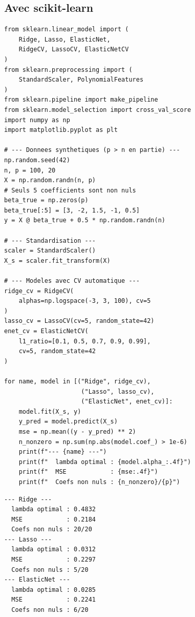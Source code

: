 \subsection{Avec scikit-learn}

\begin{codeblock}[title=\textbf{Ridge, Lasso, Elastic Net -- scikit-learn}]
\begin{verbatim}
from sklearn.linear_model import (
    Ridge, Lasso, ElasticNet,
    RidgeCV, LassoCV, ElasticNetCV
)
from sklearn.preprocessing import (
    StandardScaler, PolynomialFeatures
)
from sklearn.pipeline import make_pipeline
from sklearn.model_selection import cross_val_score
import numpy as np
import matplotlib.pyplot as plt

# --- Donnees synthetiques (p > n en partie) ---
np.random.seed(42)
n, p = 100, 20
X = np.random.randn(n, p)
# Seuls 5 coefficients sont non nuls
beta_true = np.zeros(p)
beta_true[:5] = [3, -2, 1.5, -1, 0.5]
y = X @ beta_true + 0.5 * np.random.randn(n)

# --- Standardisation ---
scaler = StandardScaler()
X_s = scaler.fit_transform(X)

# --- Modeles avec CV automatique ---
ridge_cv = RidgeCV(
    alphas=np.logspace(-3, 3, 100), cv=5
)
lasso_cv = LassoCV(cv=5, random_state=42)
enet_cv = ElasticNetCV(
    l1_ratio=[0.1, 0.5, 0.7, 0.9, 0.99],
    cv=5, random_state=42
)

for name, model in [("Ridge", ridge_cv),
                     ("Lasso", lasso_cv),
                     ("ElasticNet", enet_cv)]:
    model.fit(X_s, y)
    y_pred = model.predict(X_s)
    mse = np.mean((y - y_pred) ** 2)
    n_nonzero = np.sum(np.abs(model.coef_) > 1e-6)
    print(f"--- {name} ---")
    print(f"  lambda optimal : {model.alpha_:.4f}")
    print(f"  MSE            : {mse:.4f}")
    print(f"  Coefs non nuls : {n_nonzero}/{p}")
\end{verbatim}
\end{codeblock}

\begin{codeoutput}
\begin{verbatim}
--- Ridge ---
  lambda optimal : 0.4832
  MSE            : 0.2184
  Coefs non nuls : 20/20
--- Lasso ---
  lambda optimal : 0.0312
  MSE            : 0.2297
  Coefs non nuls : 5/20
--- ElasticNet ---
  lambda optimal : 0.0285
  MSE            : 0.2241
  Coefs non nuls : 6/20
\end{verbatim}
\end{codeoutput}

